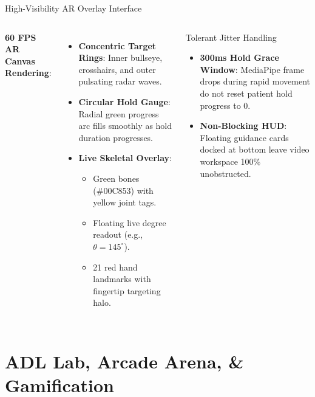 \documentclass{beamer}
\begin{document}
\begin{frame}{High-Visibility AR Overlay Interface}
\begin{columns}
\textbf{60 FPS AR Canvas Rendering}:
\begin{itemize}
    \item \textbf{Concentric Target Rings}: Inner bullseye, crosshairs, and outer pulsating radar waves.
    \item \textbf{Circular Hold Gauge}: Radial green progress arc fills smoothly as hold duration progresses.
    \item \textbf{Live Skeletal Overlay}:
    \begin{itemize}
        \item Green bones (\#00C853) with yellow joint tags.
        \item Floating live degree readout (e.g., $\theta = 145^\circ$).
        \item 21 red hand landmarks with fingertip targeting halo.
    \end{itemize}
\end{itemize}

\begin{exampleblock}{Tolerant Jitter Handling}
\begin{itemize}
    \item \textbf{300ms Hold Grace Window}: MediaPipe frame drops during rapid movement do not reset patient hold progress to 0.
    \item \textbf{Non-Blocking HUD}: Floating guidance cards docked at bottom leave video workspace 100\% unobstructed.
\end{itemize}
\end{exampleblock}
\end{columns}
\end{frame}

\section{ADL Lab, Arcade Arena, \& Gamification}
\end{document}
